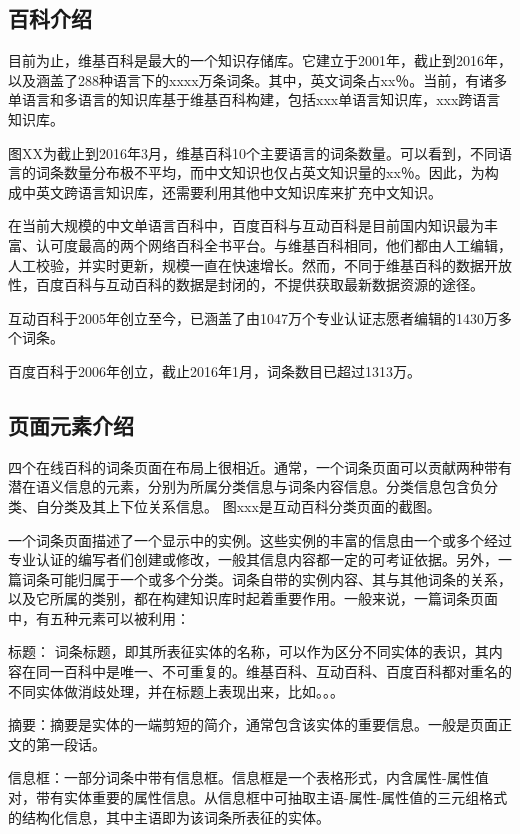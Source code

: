 \subsection{百科介绍}

目前为止，维基百科是最大的一个知识存储库。它建立于2001年，截止到2016年，以及涵盖了288种语言下的xxxx万条词条。其中，英文词条占xx％。当前，有诸多单语言和多语言的知识库基于维基百科构建，包括xxx单语言知识库，xxx跨语言知识库。

图XX为截止到2016年3月，维基百科10个主要语言的词条数量。可以看到，不同语言的词条数量分布极不平均，而中文知识也仅占英文知识量的xx％。因此，为构成中英文跨语言知识库，还需要利用其他中文知识库来扩充中文知识。

在当前大规模的中文单语言百科中，百度百科与互动百科是目前国内知识最为丰富、认可度最高的两个网络百科全书平台。与维基百科相同，他们都由人工编辑，人工校验，并实时更新，规模一直在快速增长。然而，不同于维基百科的数据开放性，百度百科与互动百科的数据是封闭的，不提供获取最新数据资源的途径。

互动百科于2005年创立至今，已涵盖了由1047万个专业认证志愿者编辑的1430万多个词条。

百度百科于2006年创立，截止2016年1月，词条数目已超过1313万。

\subsection{页面元素介绍}

四个在线百科的词条页面在布局上很相近。通常，一个词条页面可以贡献两种带有潜在语义信息的元素，分别为所属分类信息与词条内容信息。分类信息包含负分类、自分类及其上下位关系信息。 图xxx是互动百科分类页面的截图。

一个词条页面描述了一个显示中的实例。这些实例的丰富的信息由一个或多个经过专业认证的编写者们创建或修改，一般其信息内容都一定的可考证依据。另外，一篇词条可能归属于一个或多个分类。词条自带的实例内容、其与其他词条的关系，以及它所属的类别，都在构建知识库时起着重要作用。一般来说，一篇词条页面中，有五种元素可以被利用：

{\heiti 标题：} 词条标题，即其所表征实体的名称，可以作为区分不同实体的表识，其内容在同一百科中是唯一、不可重复的。维基百科、互动百科、百度百科都对重名的不同实体做消歧处理，并在标题上表现出来，比如。。。

{\heiti 摘要：}摘要是实体的一端剪短的简介，通常包含该实体的重要信息。一般是页面正文的第一段话。

{\heiti 信息框：}一部分词条中带有信息框。信息框是一个表格形式，内含属性-属性值对，带有实体重要的属性信息。从信息框中可抽取主语-属性-属性值的三元组格式的结构化信息，其中主语即为该词条所表征的实体。

